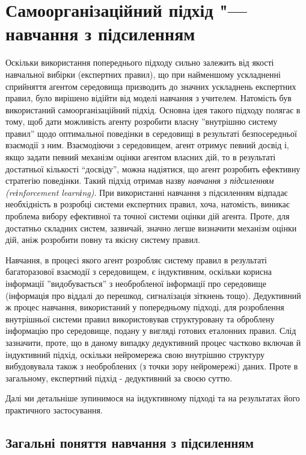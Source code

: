 \documentclass[a4paper,10pt,fleqn]{article}
\begin{document}
\section{Самоорганізаційний підхід "--- навчання з підсиленням}

Оскільки використання попереднього підходу сильно залежить від якості навчальної вибірки (експертних правил), що при найменшому ускладненні сприйняття агентом середовища призводить до значних ускладнень експертних правил, було вирішено відійти від моделі навчання з учителем. Натомість був використаний самоорганізаційний підхід. Основна ідея такого підходу полягає в тому, щоб дати можливість агенту розробити власну ''внутрішню систему правил'' щодо оптимальної поведінки в середовищі в результаті безпосередньої взаємодії з ним. Взаємодіючи з середовищем, агент отримує певний досвід і, якщо задати певний механізм оцінки агентом власних дій, то в результаті достатньої кількості ``досвіду'', можна надіятися, що агент розробить ефективну стратегію поведінки. Такий підхід отримав назву \emph{навчання з підсиленням (reіnforcement learnіng)}. При використанні навчання з підсиленням відпадає необхідність в розробці системи експертних правил, хоча, натомість, виникає проблема вибору ефективної та точної системи оцінки дій агента. Проте, для достатньо складних систем, зазвичай, значно легше визначити механізм оцінки дій, аніж розробити повну та якісну систему правил.

Навчання, в процесі якого агент розробляє систему правил в результаті багаторазової взаємодії з середовищем, є індуктивним, оскільки корисна інформації ''видобувається'' з необробленої інформації про середовище (інформація про віддалі до перешкод, сигналізація зіткнень тощо). Дедуктивний ж процес навчання, використаний у попередньому підході, для розроблення внутрішньої системи правил використовував структуровану та оброблену інформацію про середовище, подану у вигляді готових еталонних правил. Слід зазначити, проте, що в даному випадку дедуктивний процес частково включав й індуктивний підхід, оскільки нейромережа свою внутрішню структуру вибудовувала також з необроблених (з точки зору нейромережі) даних. Проте в загальному, експертний підхід - дедуктивний за своєю суттю. 

Далі ми детальніше зупинимося на індуктивному підході та на результатах його практичного застосування.

\subsection{Загальні поняття навчання з підсиленням}
\end{document}
